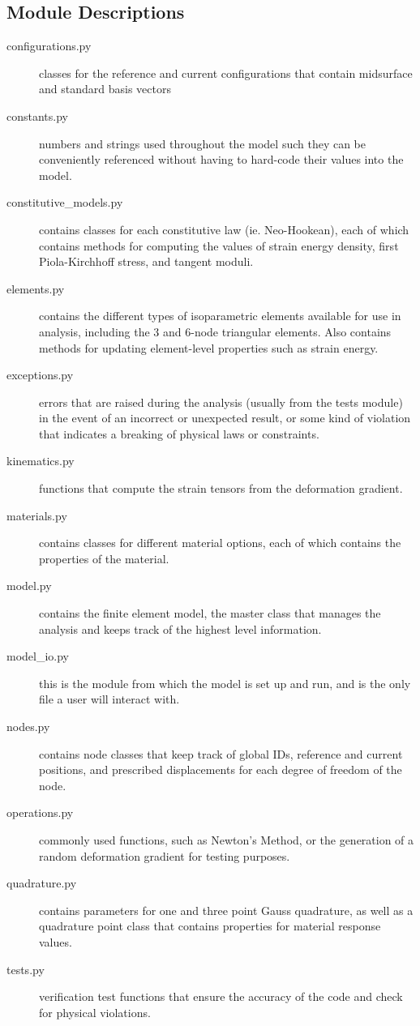 \documentclass[]{spie}  %
\begin{document}
\subsection{Module Descriptions}
\begin{description}
	\item[configurations.py] classes for the reference and current configurations that contain midsurface and standard basis vectors
	\item[constants.py] numbers and strings used throughout the model such they can be conveniently referenced without having to hard-code their values into the model.
	\item[constitutive\_models.py] contains classes for each constitutive law (ie. Neo-Hookean), each of which contains methods for computing the values of strain energy density, first Piola-Kirchhoff stress, and tangent moduli.
	\item[elements.py] contains the different types of isoparametric elements available for use in analysis, including the 3 and 6-node triangular elements. Also contains methods for updating element-level properties such as strain energy. 
	\item[exceptions.py] errors that are raised during the analysis (usually from the tests module) in the event of an incorrect or unexpected result, or some kind of violation that indicates a breaking of physical laws or constraints.
	\item[kinematics.py] functions that compute the strain tensors from the deformation gradient. 
	\item[materials.py] contains classes for different material options, each of which contains the properties of the material.
	\item[model.py] contains the finite element model, the master class that manages the analysis and keeps track of the highest level information. 
	\item[model\_io.py] this is the module from which the model is set up and run, and is the only file a user will interact with. 
	\item[nodes.py] contains node classes that keep track of global IDs, reference and current positions, and prescribed displacements for each degree of freedom of the node. 
	\item[operations.py] commonly used functions, such as Newton's Method, or the generation of a random deformation gradient for testing purposes. 
	\item[quadrature.py] contains parameters for one and three point Gauss quadrature, as well as a quadrature point class that contains properties for material response values. 
	\item[tests.py] verification test functions that ensure the accuracy of the code and check for physical violations.
\end{description}
\end{document}
